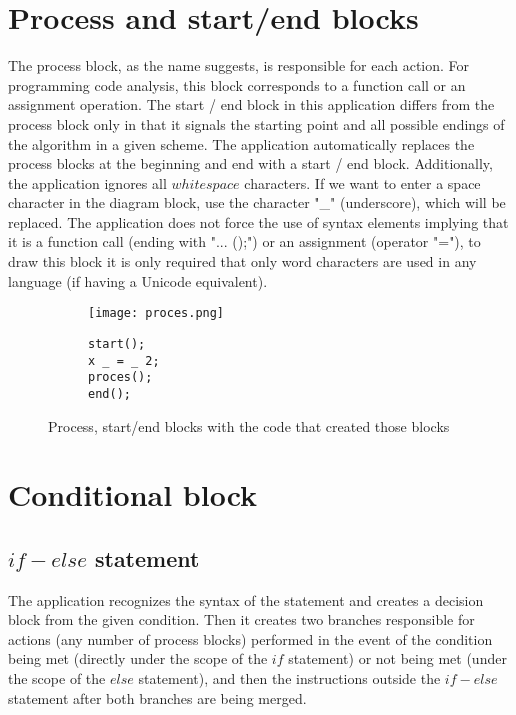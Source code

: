 \section{Process and start/end blocks}
The process block, as the name suggests, is responsible for each action. For programming code analysis, this block corresponds to a function call or an assignment operation. The start / end block in this application differs from the process block only in that it signals the starting point and all possible endings of the algorithm in a given scheme. The application automatically replaces the process blocks at the beginning and end with a start / end block. Additionally, the application ignores all $whitespace$ characters. If we want to enter a space character in the diagram block, use the character "\_" (underscore), which will be replaced. The application does not force the use of syntax elements implying that it is a function call (ending with "... ();") or an assignment (operator "="), to draw this block it is only required that only word characters  are used in any language (if having a Unicode equivalent). 
	
	\begin{figure}[H]
  \begin{subfigure}[t]{0.49\textwidth}
    \vspace{0pt}
    \texttt{[image: proces.png]}
  \end{subfigure}\hfill
  \begin{subfigure}[t]{0.49\textwidth}
    \begin{verbatim}
start();
x _ = _ 2;
proces();
end();
    \end{verbatim}
  \end{subfigure}%
  \caption{Process, start/end blocks with the code that created those blocks }
\end{figure}

\section{Conditional block }
	\subsection{$if-else$ statement }	 
	
	  The application recognizes the syntax of the statement and creates a decision block from the given condition. Then it creates two branches responsible for actions (any number of process blocks) performed in the event of the condition being met (directly under the scope of the $if$ statement) or not being met (under the scope of the $else$ statement), and then the instructions outside the $if-else$ statement after both branches are being merged.   
		
